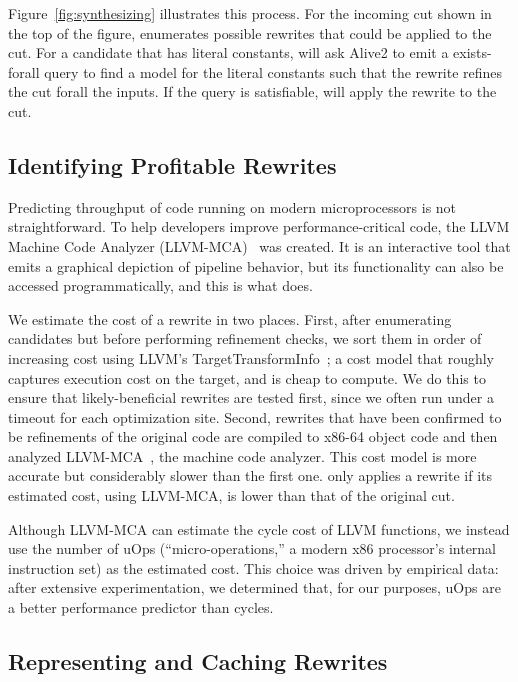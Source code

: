 Figure~\ref{fig:synthesizing} illustrates this process.
%
For the incoming cut shown in the top of the figure, \minotaur{}
enumerates possible rewrites that could be applied to the cut.
%
For a candidate that has literal constants, \minotaur{} will ask Alive2 to
emit a exists-forall query to find a model for the literal constants
such that the rewrite refines the cut forall the inputs.
%
If the query is satisfiable, \minotaur{} will apply the rewrite to the
cut.


\subsection{Identifying Profitable Rewrites}

Predicting throughput of code running on modern microprocessors is not
straightforward.
%
To help developers improve performance-critical code, the LLVM Machine
Code Analyzer (LLVM-MCA)~\cite{llvmmca} was created.
%
It is an interactive tool that emits a graphical depiction of pipeline
behavior, but its functionality can also be accessed programmatically,
and this is what \minotaur{} does.


We estimate the cost of a rewrite in two places.
%
First, after enumerating candidates but before performing refinement
checks, we sort them in order of increasing cost using LLVM's
TargetTransformInfo~\cite{tti}; a cost model that roughly captures
execution cost on the target, and is cheap to compute.
%
We do this to ensure that likely-beneficial rewrites are tested first,
since we often run \minotaur{} under a timeout for each optimization site.
%
Second, rewrites that have been confirmed to be refinements of the
original code are compiled to x86-64 object code and then analyzed
LLVM-MCA~\cite{llvmmca}, the machine code analyzer.
%
This cost model is more accurate but considerably slower than the
first one.
%
\minotaur{} only applies a rewrite if its estimated cost, using LLVM-MCA,
is lower than that of the original cut.


Although LLVM-MCA can estimate the cycle cost of LLVM functions, we instead use
the number of uOps (``micro-operations,'' a modern x86 processor's internal
instruction set) as the estimated cost.
%
This choice was driven by empirical data: after extensive
experimentation, we determined that, for our purposes, uOps are a
better performance predictor than cycles.



\subsection{Representing and Caching Rewrites}
\label{sec:rewrite}

